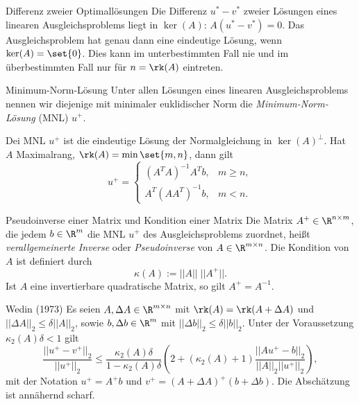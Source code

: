 \begin{karte}{Differenz zweier Optimallösungen}
    Die Differenz \( u^* - v^* \) zweier Lösungen eines linearen Ausgleichsproblems 
    liegt in \( \ker(A) \): \( A(u^* - v^*) = 0 \). Das Ausgleichsproblem hat genau dann 
    eine eindeutige Lösung, wenn \( \ker(A) = \set{0} \). Dies kann im unterbestimmten 
    Fall nie und im überbestimmten Fall nur für \( n = \rk(A) \) eintreten.
\end{karte}

\begin{karte}{Minimum-Norm-Lösung}
    Unter allen Lösungen eines linearen Ausgleichsproblems nennen wir diejenige mit 
    minimaler euklidischer Norm die \textit{Minimum-Norm-Lösung} (MNL) \(u^+\).

    Dei MNL \(u^+\) ist die eindeutige Lösung der Normalgleichung in 
    \( \ker(A)^\bot \). Hat \(A\) Maximalrang, \( \rk(A) = \min\set{m,n} \), dann gilt 
    \[ u^+ = \begin{cases}
        (A^T A)^{-1} A^T b, & m \geq n, \\
        A^T (A A^T)^{-1} b, & m < n.
    \end{cases} \]
\end{karte}

\begin{karte}{Pseudoinverse einer Matrix und Kondition einer Matrix}
    Die Matrix \( A^+ \in \R^{n\times m} \), die jedem \( b\in \R^m \) die 
    MNL \(u^+\) des Ausgleichsproblems zuordnet, heißt 
    \textit{verallgemeinerte Inverse} oder \textit{Pseudoinverse} von \(A \in\R^{m\times n}\).
    Die Kondition von \(A\) ist definiert durch 
    \[ \kappa(A) := ||A|| \; ||A^+||. \]
    Ist \(A\) eine invertierbare quadratische Matrix, so gilt \( A^+ = A^{-1} \).
\end{karte}

\begin{karte}{Wedin (1973)}
    Es seien \(A, \Delta A \in \R^{m \times n}\) mit \( \rk(A) = \rk(A + \Delta A) \)
    und \( ||\Delta A||_2 \leq \delta ||A||_2 \), sowie \( b, \Delta b \in \R^m \) 
    mit \( ||\Delta b||_2 \leq \delta ||b||_2 \). Unter der Voraussetzung \( \kappa_2(A)\delta < 1 \) gilt 
    \[ \frac{ ||u^+ - v^+ ||_2 }{ ||u^+||_2 } \leq \frac{ \kappa_2(A)\delta }{ 1 - \kappa_2(A)\delta }
    \left( 2 + (\kappa_2(A) + 1)\frac{ ||Au^+ - b||_2 }{ ||A||_2||u^+||_2 } \right), \]
    mit der Notation \( u^+ = A^+ b \) und \( v^+ = (A + \Delta A)^+ (b + \Delta b) \). 
    Die Abschätzung ist annähernd scharf.
\end{karte}

